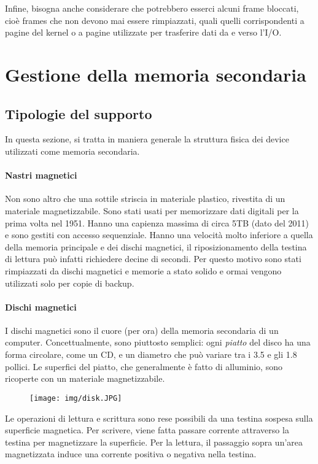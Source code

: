 \documentclass[a4]{article}
\begin{document}
Infine, bisogna anche considerare che potrebbero esserci alcuni frame bloccati, cioè frames che non devono mai essere rimpiazzati, quali quelli corrispondenti a pagine del kernel o a pagine utilizzate per trasferire dati da e verso l'I/O.


\section{Gestione della memoria secondaria}

\subsection{Tipologie del supporto}
In questa sezione, si tratta in maniera generale la struttura fisica dei device utilizzati come memoria secondaria.

\paragraph{Nastri magnetici}
Non sono altro che una sottile striscia in materiale plastico, rivestita di un materiale magnetizzabile. Sono stati usati per memorizzare dati digitali per la prima volta nel 1951. Hanno una capienza massima di circa 5TB (dato del 2011) e sono gestiti con accesso sequenziale. Hanno una velocità molto inferiore a quella della memoria principale e dei dischi magnetici, il riposizionamento della testina di lettura può infatti richiedere decine di secondi. Per questo motivo sono stati rimpiazzati da dischi magnetici e memorie a stato solido e ormai vengono utilizzati solo per copie di backup.

\paragraph{Dischi magnetici}
I dischi magnetici sono il cuore (per ora) della memoria secondaria di un computer. Concettualmente, sono piuttosto semplici: ogni \textit{piatto} del disco ha una forma circolare, come un CD, e un diametro che può variare tra i 3.5 e gli 1.8 pollici. Le superfici del piatto, che generalmente è fatto di alluminio, sono ricoperte con un materiale magnetizzabile.

\begin{figure}[h!]
    \centering
    \texttt{[image: img/disk.JPG]}
\end{figure}

Le operazioni di lettura e scrittura sono rese possibili da una testina sospesa sulla superficie magnetica. Per scrivere, viene fatta passare corrente attraverso la testina per magnetizzare la superficie. Per la lettura, il passaggio sopra un'area magnetizzata induce una corrente positiva o negativa nella testina.
\end{document}
